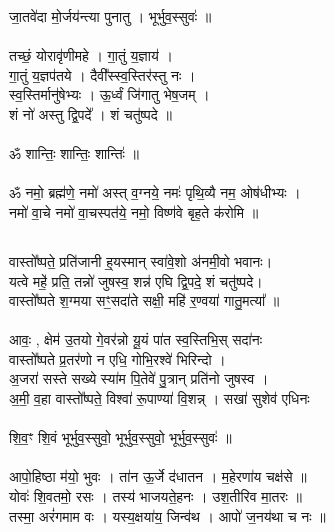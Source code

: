 जा॒तवे॑दा मो॒र्जय॑न्त्या पुनातु । भूर्भुव॒स्सुवः॑ ॥\\
\\
तच्छं॒ योरावृ॑णीमहे । गा॒तुं य॒ज्ञाय॑ ।\\
गा॒तुं य॒ज्ञप॑तये । दैवी᳚स्स्व॒स्तिर॑स्तु नः । \\
स्व॒स्तिर्मानु॑षेभ्यः । ऊ॒र्ध्वं जि॑गातु भेष॒जम् ।\\
शं नो॑ अस्तु द्वि॒पदे᳚ । शं चतु॑ष्पदे ॥\\
\\
ॐ शान्तिः॒ शान्तिः॒ शान्तिः॑ ॥\\
\\
ॐ नमो॒ ब्रह्म॑णे॒ नमो॑ अस्त् व॒ग्नये॒ नमः॑ पृथि॒व्यै नम॒ ओष॑धीभ्यः ।\\
नमो॑ वा॒चे नमो॑ वा॒चस्पत॑ये॒ नमो॒ विष्ण॑वे बृह॒ते क॑रोमि ॥\\
\subsection{}
वास्तो᳚ष्पते॒ प्रति॑जानी ह्॒यस्मान्  स्वा॑वे॒शो अ॑नमी॒वो भवानः। \\
यत्वे महे॒॑ प्रति॒ तन्नो॑ जुषस्व॒ शन्न॑ एघि द्वि॒पदे॒ शं चतु॑ष्पदे। \\
वास्तो᳚ष्पते श॒ग्मया सꣳ॒सदा॑ते सक्षी॒ महि॑ र॒ण्वया॑ गातु॒मत्या᳚ ॥\\
\\
आवः॒ , क्षेम॑ उ॒तयो गे॒वर॑न्नो यू॒यं पा॑त स्व॒स्तिभि॒स् सदा॑नः \\
वास्तो᳚ष्पते प्र॒तर॑णो न एधि॒ गोभि॒रश्वे॑ भिरिन्दो ।\\
अ॒जरा॑ सस्ते सख्ये स्या॑म पि॒तेवे॑ पु॒त्रान् प्रति॑नो जुषस्व ।\\
अ॒मी॒ व॒हा वास्तो᳚ष्पते॒ विश्वा॑ रू॒पाण्या॑ वि॒शन्न् । सखा॑ सुशेव॑ एधिनः \\
\\
शि॒व॒ꣳ शि॒वं भूर्भुव॒स्सुवो॒ भूर्भुव॒स्सुवो॒ भूर्भुव॒स्सुवः॑ ॥\\
\\
आपो॒हिष्ठा म॑यो॒ भुवः । ता॑न ऊ॒र्जे द॑धातन । म॒हेरणा॑य चक्ष॑से ॥\\
योवः॑ शि॒वतमो॒ रसः । तस्य॑ भाजयते॒हनः । उश॒तीरिव मा॒तरः ॥\\
तस्मा॒ अरं॑गमाम वः । यस्य॒क्षया॑य॒ जिन्व॑थ । आपो॑ ज॒नय॑था च नः ॥\\
